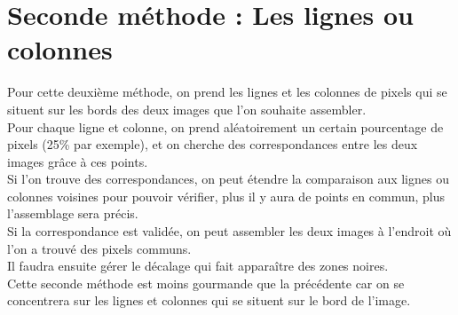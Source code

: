 \documentclass[a4paper,french,12pt]{report}
\begin{document}
		\section{Seconde méthode : Les lignes ou colonnes}
		    Pour cette deuxième méthode, on prend les lignes et les colonnes de pixels qui se situent sur les bords des deux images que l'on souhaite assembler. \\
		    Pour chaque ligne et colonne, on prend aléatoirement un certain pourcentage de pixels (25\% par exemple), et on cherche des correspondances entre les deux images grâce à ces points.\\
		    Si l'on trouve des correspondances, on peut étendre la comparaison aux lignes ou colonnes voisines pour pouvoir vérifier, plus il y aura de points en commun, plus l'assemblage sera précis.\\
		    Si la correspondance est validée, on peut assembler les deux images à l'endroit où l'on a trouvé des pixels communs.\\
		    Il faudra ensuite gérer le décalage qui fait apparaître des zones noires.\\
		   Cette seconde méthode est moins gourmande que la précédente car on se concentrera sur les lignes et colonnes qui se situent sur le bord de l'image.
		    
\end{document}
